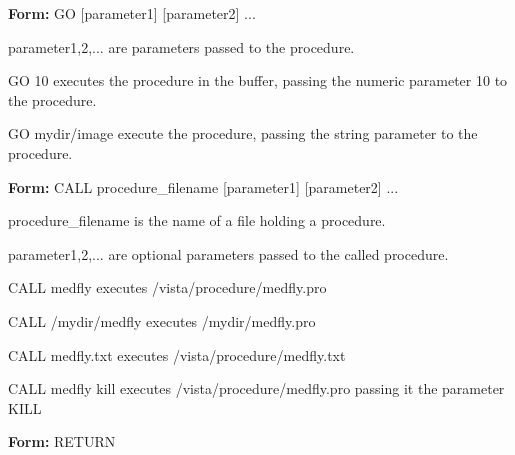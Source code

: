 {\newpage\clearpage
{}%
\begin{command}
  \item[\textbf{Form: } GO {[parameter1]} {[parameter2]} ...]{}
  \item[parameter1,2,...]{are parameters passed to the procedure.}
\end{command}%
\lthtmlfigureZ
\lthtmlcheckvsize\clearpage}

{\newpage\clearpage
{}%
\begin{example}
  \item[GO 10\hfill]{executes the procedure in the buffer,
       passing the numeric parameter 10 to the procedure.}
  \item[GO mydir/image\hfill]{execute the procedure, passing the
        string parameter to the procedure.}
\end{example}%
\lthtmlfigureZ
\lthtmlcheckvsize\clearpage}

{\newpage\clearpage
{}%
\begin{command}
  \item[\textbf{Form: } CALL procedure\_filename {[parameter1]} {[parameter2]} ...\hfill]{}
  \item[procedure\_filename]{is the name of a file holding a procedure.}
  \item[parameter1,2,...]{are optional parameters passed to the called procedure.}
\end{command}%
\lthtmlfigureZ
\lthtmlcheckvsize\clearpage}

{\newpage\clearpage
{}%
\begin{example}
  \item[CALL medfly\hfill]{executes /vista/procedure/medfly.pro}
  \item[CALL /mydir/medfly\hfill]{executes /mydir/medfly.pro}
  \item[CALL medfly.txt\hfill]{executes /vista/procedure/medfly.txt}
  \item[CALL medfly kill\hfill]{executes /vista/procedure/medfly.pro
passing it the parameter KILL}
\end{example}%
\lthtmlfigureZ
\lthtmlcheckvsize\clearpage}

{\newpage\clearpage
{}%
\begin{command}
  \item[\textbf{Form: } RETURN\hfill]{}
\end{command}%
\lthtmlfigureZ
\lthtmlcheckvsize\clearpage}

